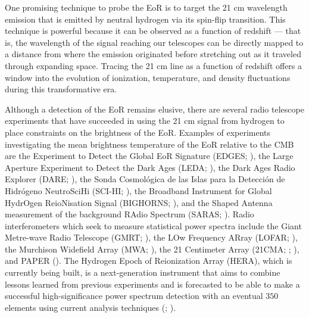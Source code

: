 \documentclass[preprint2,numberedappendix,tighten]{aastex6}  %
\begin{document}
One promising technique to probe the EoR is to target the 21 cm wavelength emission that is emitted by neutral hydrogen via its spin-flip transition. This technique is powerful because it can be observed as a function of redshift --- that is, the wavelength of the signal reaching our telescopes can be directly mapped to a distance from where the emission originated before stretching out as it traveled through expanding space. Tracing the 21 cm line as a function of redshift offers a window into the evolution of ionization, temperature, and density fluctuations during this transformative era.

Although a detection of the EoR remains elusive, there are several radio telescope experiments that have succeeded in using the 21 cm signal from hydrogen to place constraints on the brightness of the EoR. Examples of experiments investigating the mean brightness temperature of the EoR relative to the CMB are the Experiment to Detect the Global EoR Signature (EDGES; \citealt{bowman2010}), the Large Aperture Experiment to Detect the Dark Ages (LEDA; \citealt{greenhill_bernardi2012}), the Dark Ages Radio Explorer (DARE; \citealt{burns2012}), the Sonda Cosmol\'ogica de las Islas para la Detecci\'on de Hidr\'ogeno NeutroSciHi (SCI-HI; \citealt{voytek2014}), the Broadband Instrument for Global HydrOgen ReioNisation Signal (BIGHORNS; \citealt{sokolowski2015}), and the Shaped Antenna measurement of the background RAdio Spectrum (SARAS; \citealt{patra2015}). Radio interferometers which seek to measure statistical power spectra include the Giant Metre-wave Radio Telescope (GMRT; \citealt{paciga_et_al2013}), the LOw Frequency ARray (LOFAR; \citealt{van_haarlem_et_al2013}), the Murchison Widefield Array (MWA; \citealt{tingay_et_al2013}), the 21 Centimeter Array (21CMA; \citealt{peterson_et_al2004}; \citealt{wu2009}), and PAPER (\citealt{parsons_et_al2010}). The Hydrogen Epoch of Reionization Array (HERA), which is currently being built, is a next-generation instrument that aims to combine lessons learned from previous experiments and is forecasted to be able to make a successful high-significance power spectrum detection with an eventual $350$ elements using current analysis techniques (\citealt{deboer_et_al2017}; \citealt{pober_et_al2014}).
\end{document}
